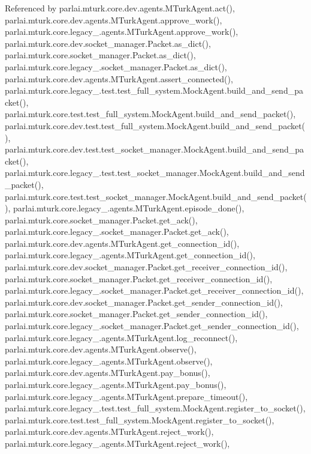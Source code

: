 Referenced by parlai.\+mturk.\+core.\+dev.\+agents.\+M\+Turk\+Agent.\+act(), parlai.\+mturk.\+core.\+dev.\+agents.\+M\+Turk\+Agent.\+approve\+\_\+work(), parlai.\+mturk.\+core.\+legacy\+\_.\+agents.\+M\+Turk\+Agent.\+approve\+\_\+work(), parlai.\+mturk.\+core.\+dev.\+socket\+\_\+manager.\+Packet.\+as\+\_\+dict(), parlai.\+mturk.\+core.\+socket\+\_\+manager.\+Packet.\+as\+\_\+dict(), parlai.\+mturk.\+core.\+legacy\+\_.\+socket\+\_\+manager.\+Packet.\+as\+\_\+dict(), parlai.\+mturk.\+core.\+dev.\+agents.\+M\+Turk\+Agent.\+assert\+\_\+connected(), parlai.\+mturk.\+core.\+legacy\+\_.\+test.\+test\+\_\+full\+\_\+system.\+Mock\+Agent.\+build\+\_\+and\+\_\+send\+\_\+packet(), parlai.\+mturk.\+core.\+test.\+test\+\_\+full\+\_\+system.\+Mock\+Agent.\+build\+\_\+and\+\_\+send\+\_\+packet(), parlai.\+mturk.\+core.\+dev.\+test.\+test\+\_\+full\+\_\+system.\+Mock\+Agent.\+build\+\_\+and\+\_\+send\+\_\+packet(), parlai.\+mturk.\+core.\+dev.\+test.\+test\+\_\+socket\+\_\+manager.\+Mock\+Agent.\+build\+\_\+and\+\_\+send\+\_\+packet(), parlai.\+mturk.\+core.\+legacy\+\_.\+test.\+test\+\_\+socket\+\_\+manager.\+Mock\+Agent.\+build\+\_\+and\+\_\+send\+\_\+packet(), parlai.\+mturk.\+core.\+test.\+test\+\_\+socket\+\_\+manager.\+Mock\+Agent.\+build\+\_\+and\+\_\+send\+\_\+packet(), parlai.\+mturk.\+core.\+legacy\+\_.\+agents.\+M\+Turk\+Agent.\+episode\+\_\+done(), parlai.\+mturk.\+core.\+socket\+\_\+manager.\+Packet.\+get\+\_\+ack(), parlai.\+mturk.\+core.\+legacy\+\_.\+socket\+\_\+manager.\+Packet.\+get\+\_\+ack(), parlai.\+mturk.\+core.\+dev.\+agents.\+M\+Turk\+Agent.\+get\+\_\+connection\+\_\+id(), parlai.\+mturk.\+core.\+legacy\+\_.\+agents.\+M\+Turk\+Agent.\+get\+\_\+connection\+\_\+id(), parlai.\+mturk.\+core.\+dev.\+socket\+\_\+manager.\+Packet.\+get\+\_\+receiver\+\_\+connection\+\_\+id(), parlai.\+mturk.\+core.\+socket\+\_\+manager.\+Packet.\+get\+\_\+receiver\+\_\+connection\+\_\+id(), parlai.\+mturk.\+core.\+legacy\+\_.\+socket\+\_\+manager.\+Packet.\+get\+\_\+receiver\+\_\+connection\+\_\+id(), parlai.\+mturk.\+core.\+dev.\+socket\+\_\+manager.\+Packet.\+get\+\_\+sender\+\_\+connection\+\_\+id(), parlai.\+mturk.\+core.\+socket\+\_\+manager.\+Packet.\+get\+\_\+sender\+\_\+connection\+\_\+id(), parlai.\+mturk.\+core.\+legacy\+\_.\+socket\+\_\+manager.\+Packet.\+get\+\_\+sender\+\_\+connection\+\_\+id(), parlai.\+mturk.\+core.\+legacy\+\_.\+agents.\+M\+Turk\+Agent.\+log\+\_\+reconnect(), parlai.\+mturk.\+core.\+dev.\+agents.\+M\+Turk\+Agent.\+observe(), parlai.\+mturk.\+core.\+legacy\+\_.\+agents.\+M\+Turk\+Agent.\+observe(), parlai.\+mturk.\+core.\+dev.\+agents.\+M\+Turk\+Agent.\+pay\+\_\+bonus(), parlai.\+mturk.\+core.\+legacy\+\_.\+agents.\+M\+Turk\+Agent.\+pay\+\_\+bonus(), parlai.\+mturk.\+core.\+legacy\+\_.\+agents.\+M\+Turk\+Agent.\+prepare\+\_\+timeout(), parlai.\+mturk.\+core.\+legacy\+\_.\+test.\+test\+\_\+full\+\_\+system.\+Mock\+Agent.\+register\+\_\+to\+\_\+socket(), parlai.\+mturk.\+core.\+test.\+test\+\_\+full\+\_\+system.\+Mock\+Agent.\+register\+\_\+to\+\_\+socket(), parlai.\+mturk.\+core.\+dev.\+agents.\+M\+Turk\+Agent.\+reject\+\_\+work(), parlai.\+mturk.\+core.\+legacy\+\_.\+agents.\+M\+Turk\+Agent.\+reject\+\_\+work(), 